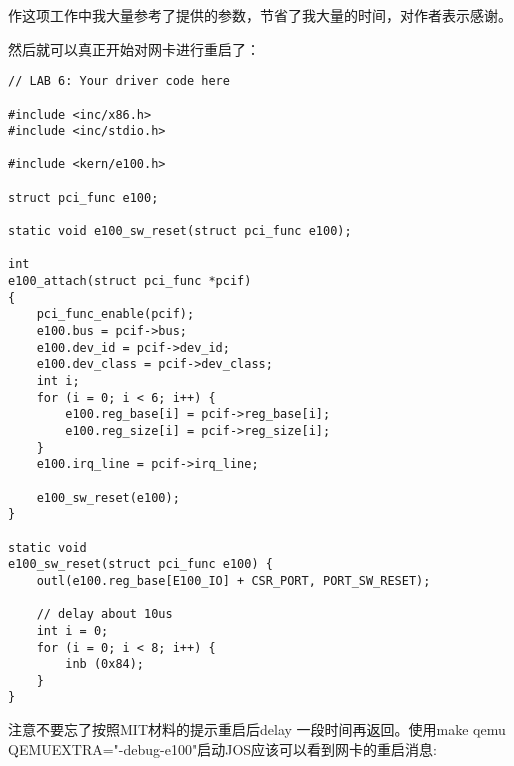 \documentclass{article}
\begin{document}
\begin{CJK*}{UTF8}{gkai}
作这项工作中我大量参考了提供的参数，节省了我大量的时间，对作者表示感谢。


然后就可以真正开始对网卡进行重启了：


\begin{lstlisting}[style=ccode, firstnumber=36, title={\scriptsize \ttfamily \bfseries kern/e100.c}]
// LAB 6: Your driver code here

#include <inc/x86.h>
#include <inc/stdio.h>

#include <kern/e100.h>

struct pci_func e100;

static void e100_sw_reset(struct pci_func e100);

int 
e100_attach(struct pci_func *pcif) 
{
    pci_func_enable(pcif);
    e100.bus = pcif->bus;
    e100.dev_id = pcif->dev_id;
    e100.dev_class = pcif->dev_class;
    int i;
    for (i = 0; i < 6; i++) {
    	e100.reg_base[i] = pcif->reg_base[i];
        e100.reg_size[i] = pcif->reg_size[i];
    }
    e100.irq_line = pcif->irq_line;

    e100_sw_reset(e100);
}

static void
e100_sw_reset(struct pci_func e100) {
    outl(e100.reg_base[E100_IO] + CSR_PORT, PORT_SW_RESET);

    // delay about 10us
    int i = 0;
    for (i = 0; i < 8; i++) {
        inb (0x84);
    }
}

\end{lstlisting}

注意不要忘了按照MIT材料的提示重启后delay 一段时间再返回。使用make qemu QEMUEXTRA="-debug-e100"启动JOS应该可以看到网卡的重启消息:


\end{CJK*}
\end{document}
